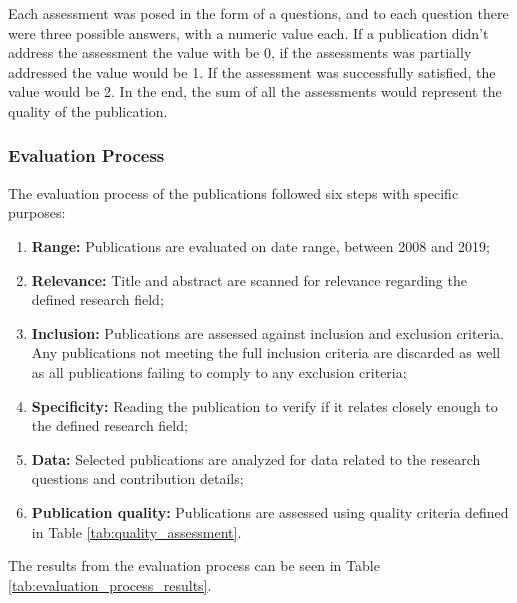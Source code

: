 Each assessment was posed in the form of a questions, and to each question there were three possible answers, with a numeric value each. If a publication didn't address the assessment the value with be 0, if the assessments was partially addressed the value would be 1. If the assessment was successfully satisfied, the value would be 2. In the end, the sum of all the assessments would represent the quality of the publication.

\subsubsection{Evaluation Process}\label{sec:evaluation_process}

The evaluation process of the publications followed six steps with specific purposes:

\begin{enumerate}
    \item \textbf{Range:} Publications are evaluated on date range, between 2008 and 2019;
    \item \textbf{Relevance:} Title and abstract are scanned for relevance regarding the defined research field;
    \item \textbf{Inclusion:} Publications are assessed against inclusion and exclusion criteria. Any publications not meeting the full inclusion criteria are discarded as well as all publications failing to comply to any exclusion criteria;
    \item \textbf{Specificity:} Reading the publication to verify if it relates closely enough to the defined research field; 
    \item \textbf{Data:} Selected publications are analyzed for data related to the research questions and contribution details;
    \item \textbf{Publication quality:} Publications are assessed using quality criteria defined in Table \ref{tab:quality_assessment}.
\end{enumerate}{}

The results from the evaluation process can be seen in Table \ref{tab:evaluation_process_results}.

\captionsetup{belowskip=12pt,aboveskip=4pt}
\begin{table}[ht]
    \centering
    \caption{Publications per step}
    \label{tab:evaluation_process_results}
\end{table}{}

